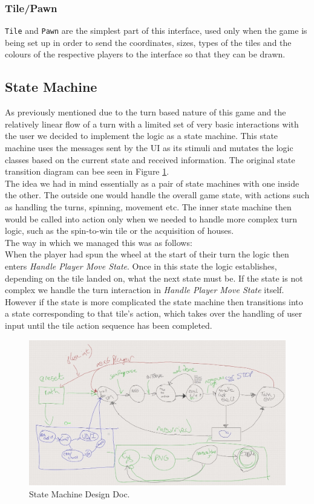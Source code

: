 \documentclass[a4paper, 11pt]{article}
\begin{document}
	\subsubsection*{Tile/Pawn}
	\texttt{Tile} and \texttt{Pawn} are the simplest part of this interface, used only when the game is being set up in order to send the coordinates, sizes, types of the tiles and the colours of the respective players to the interface so that they can be drawn.
	
	\subsection*{State Machine}
	As previously mentioned due to the turn based nature of this game and the relatively linear flow of a turn with a limited set of very basic interactions with the user we decided to implement the logic as a state machine. This state machine uses the messages sent by the UI as its stimuli and mutates the logic classes based on the current state and received information. The original state transition diagram can bee seen in Figure \ref{fig:state_machine}.\\
	The idea we had in mind essentially as a pair of state machines with one inside the other. The outside one would handle the overall game state, with actions such as handling the turns, spinning, movement etc. The inner state machine then would be called into action only when we needed to handle more complex turn logic, such as the spin-to-win tile or the acquisition of houses.\\
	The way in which we managed this was as follows:\\
	When the player had spun the wheel at the start of their turn the logic then enters \textit{Handle Player Move State}. Once in this state the logic establishes, depending on the tile landed on, what the next state must be. If the state is not complex we handle the turn interaction in \textit{Handle Player Move State} itself. However if the state is more complicated the state machine then transitions into a state corresponding to that tile's action, which takes over the handling of user input until the tile action sequence has been completed.
	\begin{figure}[!h]
		\centering
		\includegraphics[scale=.4]{highlevel_state_diagram}
		\caption{State Machine Design Doc.}
		\label{fig:state_machine}
	\end{figure}
\end{document}
